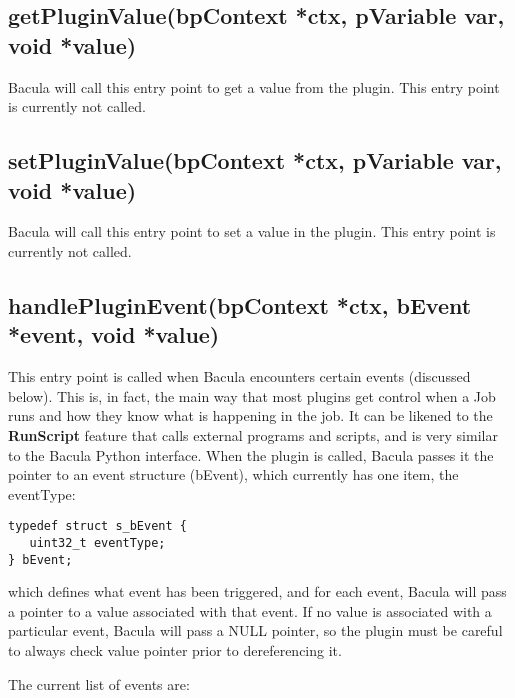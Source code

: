\subsection{getPluginValue(bpContext *ctx, pVariable var, void *value)}
Bacula will call this entry point to get
a value from the plugin.  This entry point is currently not called.

\subsection{setPluginValue(bpContext *ctx, pVariable var, void *value)}
Bacula will call this entry point to set
a value in the plugin.  This entry point is currently not called.

\subsection{handlePluginEvent(bpContext *ctx, bEvent *event, void *value)}
This entry point is called when Bacula
encounters certain events (discussed below). This is, in fact, the
main way that most plugins get control when a Job runs and how
they know what is happening in the job. It can be likened to the
{\bf RunScript} feature that calls external programs and scripts,
and is very similar to the Bacula Python interface.
When the plugin is called, Bacula passes it the pointer to an event
structure (bEvent), which currently has one item, the eventType:

\begin{verbatim}
typedef struct s_bEvent {
   uint32_t eventType;
} bEvent;
\end{verbatim}

  which defines what event has been triggered, and for each event,
  Bacula will pass a pointer to a value associated with that event.
  If no value is associated with a particular event, Bacula will
  pass a NULL pointer, so the plugin must be careful to always check
  value pointer prior to dereferencing it.

  The current list of events are:

